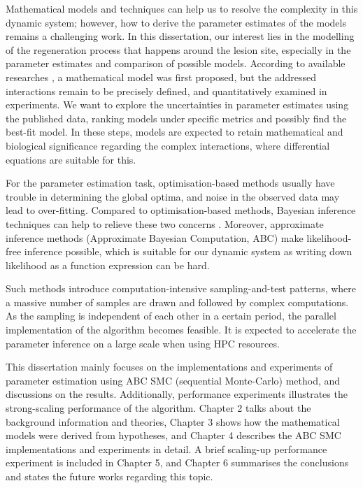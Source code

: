 Mathematical models and techniques can help us to resolve the complexity in this dynamic system; however, how to derive the parameter estimates of the models remains a challenging work. In this dissertation, our interest lies in the modelling of the regeneration process that happens around the lesion site, especially in the parameter estimates and comparison of possible models. According to available researches \cite{ref:Tsarouchas}, a mathematical model was first proposed, but the addressed interactions remain to be precisely defined, and quantitatively examined in experiments. We want to explore the uncertainties in parameter estimates using the published data, ranking models under specific metrics and possibly find the best-fit model. In these steps, models are expected to retain mathematical and biological significance regarding the complex interactions, where differential equations are suitable for this.


For the parameter estimation task, optimisation-based methods usually have trouble in determining the global optima, and noise in the observed data may lead to over-fitting. Compared to optimisation-based methods, Bayesian inference techniques can help to relieve these two concerns \cite{ref:abcsysbio}. Moreover, approximate inference methods (Approximate Bayesian Computation, ABC) make likelihood-free inference possible, which is suitable for our dynamic system as writing down likelihood as a function expression can be hard.

Such methods introduce computation-intensive sampling-and-test patterns, where a massive number of samples are drawn and followed by complex computations. As the sampling is independent of each other in a certain period, the parallel implementation of the algorithm becomes feasible. It is expected to accelerate the parameter inference on a large scale when using HPC resources.

This dissertation mainly focuses on the implementations and experiments of parameter estimation using ABC SMC (sequential Monte-Carlo) method, and discussions on the results. Additionally, performance experiments illustrates the strong-scaling performance of the algorithm. Chapter 2 talks about the background information and theories, Chapter 3 shows how the mathematical models were derived from hypotheses, and Chapter 4 describes the ABC SMC implementations and experiments in detail. A brief scaling-up performance experiment is included in Chapter 5, and Chapter 6 summarises the conclusions and states the future works regarding this topic.
